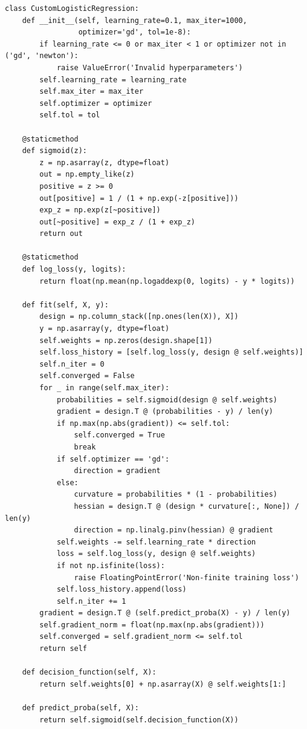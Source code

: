 \documentclass[a4paper,12pt]{article}
\begin{document}
\begin{verbatim}
class CustomLogisticRegression:
    def __init__(self, learning_rate=0.1, max_iter=1000,
                 optimizer='gd', tol=1e-8):
        if learning_rate <= 0 or max_iter < 1 or optimizer not in ('gd', 'newton'):
            raise ValueError('Invalid hyperparameters')
        self.learning_rate = learning_rate
        self.max_iter = max_iter
        self.optimizer = optimizer
        self.tol = tol

    @staticmethod
    def sigmoid(z):
        z = np.asarray(z, dtype=float)
        out = np.empty_like(z)
        positive = z >= 0
        out[positive] = 1 / (1 + np.exp(-z[positive]))
        exp_z = np.exp(z[~positive])
        out[~positive] = exp_z / (1 + exp_z)
        return out

    @staticmethod
    def log_loss(y, logits):
        return float(np.mean(np.logaddexp(0, logits) - y * logits))

    def fit(self, X, y):
        design = np.column_stack([np.ones(len(X)), X])
        y = np.asarray(y, dtype=float)
        self.weights = np.zeros(design.shape[1])
        self.loss_history = [self.log_loss(y, design @ self.weights)]
        self.n_iter = 0
        self.converged = False
        for _ in range(self.max_iter):
            probabilities = self.sigmoid(design @ self.weights)
            gradient = design.T @ (probabilities - y) / len(y)
            if np.max(np.abs(gradient)) <= self.tol:
                self.converged = True
                break
            if self.optimizer == 'gd':
                direction = gradient
            else:
                curvature = probabilities * (1 - probabilities)
                hessian = design.T @ (design * curvature[:, None]) / len(y)
                direction = np.linalg.pinv(hessian) @ gradient
            self.weights -= self.learning_rate * direction
            loss = self.log_loss(y, design @ self.weights)
            if not np.isfinite(loss):
                raise FloatingPointError('Non-finite training loss')
            self.loss_history.append(loss)
            self.n_iter += 1
        gradient = design.T @ (self.predict_proba(X) - y) / len(y)
        self.gradient_norm = float(np.max(np.abs(gradient)))
        self.converged = self.gradient_norm <= self.tol
        return self

    def decision_function(self, X):
        return self.weights[0] + np.asarray(X) @ self.weights[1:]

    def predict_proba(self, X):
        return self.sigmoid(self.decision_function(X))


\end{verbatim}
\end{document}
